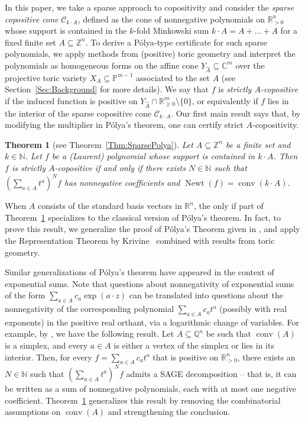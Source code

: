 \documentclass[a4paper,11pt]{amsart}
\newtheorem{theoremintro}{Theorem}
\theoremstyle{definition}
\DeclareMathOperator{\conv}{conv}
\DeclareMathOperator{\Newt}{Newt}
\newcommand{\ZZ}{\mathbb{Z}}
\newcommand{\NN}{\mathbb{N}}
\newcommand{\QQ}{\mathbb{Q}}
\newcommand{\RR}{\mathbb{R}}
\newcommand{\CC}{\mathbb{C}}
\newcommand{\cC}{\mathcal{C}}
\begin{document}
In this paper, we take a sparse approach to copositivity and consider the \emph{sparse copositive cone} $\cC_{k \cdot A}$, defined as the cone of nonnegative polynomials on $\RR^n_{>0}$ whose support is contained in the $k$-fold Minkowski sum $k\cdot A= A + \dots +A$ for a fixed finite set $A \subseteq \ZZ^n$. To derive a Pólya-type certificate for such sparse polynomials, we apply methods from (positive) toric geometry and interpret the polynomials as homogeneous forms on the affine cone $Y_{\hat{A}} \subseteq \CC^m$ over the projective toric variety $X_A \subseteq \mathbb{P}^{m-1}$ associated to the set $A$ (see Section~\ref{Sec:Background} for more details). We say that $f$ is \emph{strictly $A$-copositive} if the induced function is positive on $Y_{\hat{A}} \cap \RR^m_{\geq0}\setminus\{0\}$, or equivalently if $f$ lies in the interior of the sparse copositive cone $\cC_{k\cdot A}$.
Our first main result says that, by modifying the multiplier in Pólya’s theorem, one can certify strict $A$-copositivity.
\begin{theoremintro}[{see Theorem~\ref{Thm:SparsePolya}}]
\label{Thm:Main}
Let $A \subseteq \ZZ^n$ be a finite set and $k \in \NN$.
Let $f$ be a (Laurent) polynomial whose support is contained in $k \cdot A$.
Then $f$ is strictly $A$-copositive if and only if there exists $N \in \NN$ such that $(\sum_{a \in A}t^a)^N f$ has nonnegative coefficients and $\Newt(f) = \conv(k \cdot A)$.
\end{theoremintro}

When $A$ consists of the standard basis vectors in $\RR^n$, the only if part of Theorem~\ref{Thm:Main} specializes to the classical version of Pólya’s theorem. In fact, to prove this result, we generalize the proof of Pólya's Theorem given in \cite[Theorem 5.5.1]{Marshall}, \cite[Theorem 5.4.1]{Scheiderer2024} and apply the Representation Theorem by Krivine~\cite{Krivine} combined with results from toric geometry.


Similar generalizations of Pólya's theorem have appeared in the context of exponential sums. 
Note that questions about nonnegativity of exponential sums of the form $\sum_{a \in A} c_{a} \exp(a \cdot z)$  can be translated into questions about the nonnegativity of the corresponding polynomial  $\sum_{a \in A} c_{a} t^a$  (possibly with real exponents) in the positive real orthant, via a logarithmic change of variables.
For example, by \cite[Theorem 4.1]{ChandrasekaranShah}, we have the following result.
Let $A \subseteq \QQ^n$ be such that $\conv(A)$ is a simplex, and every $a \in A$ is either a vertex of the simplex or lies in its interior.
Then, for every $f = \sum_{a \in A} c_{a} t^a$ that is positive on $\RR^n_{>0}$, there exists an $N \in \NN$ such that $(\sum_{a \in A}t^a)^Nf$ admits a SAGE decomposition -- that is, it can be written as a sum of nonnegative polynomials, each with at most one negative coefficient.
Theorem~\ref{Thm:Main} generalizes this result by removing the combinatorial assumptions on $\conv(A)$ and strengthening the conclusion.
\end{document}
